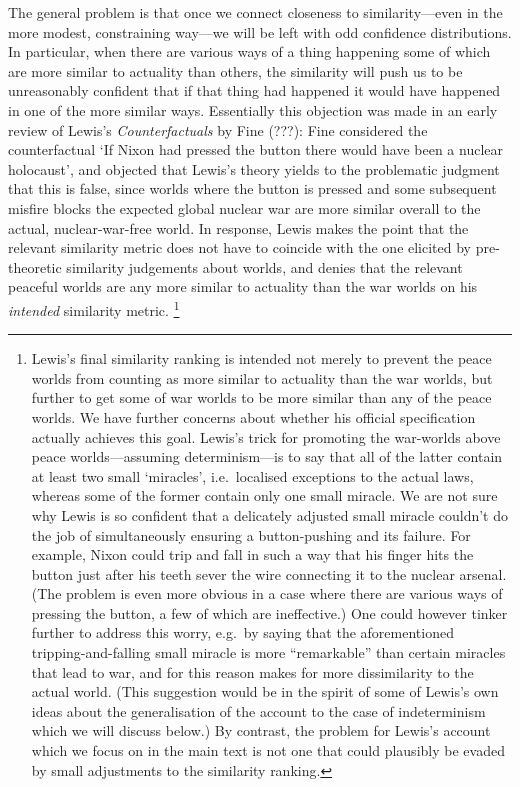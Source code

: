 \documentclass[If.tex]{subfiles}
\begin{document}
The general problem is that once we connect closeness to similarity---even in the more modest, constraining way---we will be left with odd confidence distributions. In particular, when there are various ways of a thing happening some of which are more similar to actuality than others, the similarity will push us to be unreasonably confident that if that thing had happened it would have happened in one of the more similar ways. Essentially this objection was made in an early review of Lewis's \emph{Counterfactuals} by Fine (???): Fine considered the counterfactual ‘If Nixon had pressed the button there would have been a nuclear holocaust’, and objected that Lewis's theory yields to the problematic judgment that this is false, since worlds where the button is pressed and some subsequent misfire blocks the expected global nuclear war are more similar overall to the actual, nuclear-war-free world. In response, Lewis makes the point that the relevant similarity metric does not have to coincide with the one elicited by pre-theoretic similarity judgements about worlds, and denies that the relevant peaceful worlds are any more similar to actuality than the war worlds on his \emph{intended} similarity metric.%
\footnote{Lewis's final similarity ranking is intended not merely to prevent the peace worlds from counting as more similar to actuality than the war worlds, but further to get some of war worlds to be more similar than any of the peace worlds. We have further concerns about whether his official specification actually achieves this goal. Lewis's trick for promoting the war-worlds above peace worlds---assuming determinism---is to say that all of the latter contain at least two small ‘miracles’, i.e.~localised exceptions to the actual laws, whereas some of the former contain only one small miracle. We are not sure why Lewis is so confident that a delicately adjusted small miracle couldn't do the job of simultaneously ensuring a button-pushing and its failure. For example, Nixon could trip and fall in such a way that his finger hits the button just after his teeth sever the wire connecting it to the nuclear arsenal. (The problem is even more obvious in a case where there are various ways of pressing the button, a few of which are ineffective.) One could however tinker further to address this worry, e.g.~by saying that the aforementioned tripping-and-falling small miracle is more “remarkable” than certain miracles that lead to war, and for this reason makes for more dissimilarity to the actual world. (This suggestion would be in the spirit of some of Lewis's own ideas about the generalisation of the account to the case of indeterminism which we will discuss below.) By contrast, the problem for Lewis's account which we focus on in the main text is not one that could plausibly be evaded by small adjustments to the similarity ranking.} 
\end{document}
